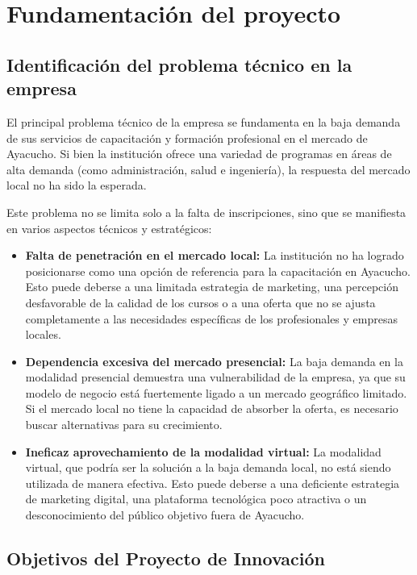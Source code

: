 \section{Fundamentación del proyecto}

\subsection{Identificación del problema técnico en la empresa}
El principal problema técnico de la empresa se fundamenta en la baja demanda de sus servicios de capacitación y formación profesional en el mercado de Ayacucho. Si bien la institución ofrece una variedad de programas en áreas de alta demanda (como administración, salud e ingeniería), la respuesta del mercado local no ha sido la esperada.

Este problema no se limita solo a la falta de inscripciones, sino que se manifiesta en varios aspectos técnicos y estratégicos:

\begin{itemize}
	\item \textbf{Falta de penetración en el mercado local:} La institución no ha logrado posicionarse como una opción de referencia para la capacitación en Ayacucho. Esto puede deberse a una limitada estrategia de marketing, una percepción desfavorable de la calidad de los cursos o a una oferta que no se ajusta completamente a las necesidades específicas de los profesionales y empresas locales.
	
	\item \textbf{Dependencia excesiva del mercado presencial:} La baja demanda en la modalidad presencial demuestra una vulnerabilidad de la empresa, ya que su modelo de negocio está fuertemente ligado a un mercado geográfico limitado. Si el mercado local no tiene la capacidad de absorber la oferta, es necesario buscar alternativas para su crecimiento.
	
	\item \textbf{Ineficaz aprovechamiento de la modalidad virtual:} La modalidad virtual, que podría ser la solución a la baja demanda local, no está siendo utilizada de manera efectiva. Esto puede deberse a una deficiente estrategia de marketing digital, una plataforma tecnológica poco atractiva o un desconocimiento del público objetivo fuera de Ayacucho.
\end{itemize}

\subsection{Objetivos del Proyecto de Innovación}
